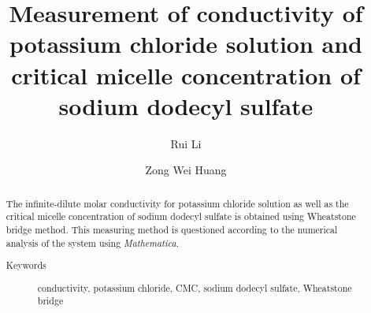 \documentclass[%
 reprint,
 amsmath,amssymb,
 aps,
]{revtex4-1}
\begin{document}

\title{Measurement of conductivity of potassium chloride solution and critical micelle concentration of sodium dodecyl sulfate}%

\author{Rui Li}
%


\author{Zong Wei Huang}
%



\begin{abstract}
The infinite-dilute molar conductivity for potassium chloride solution as well as the critical micelle concentration of sodium dodecyl sulfate is obtained using Wheatstone bridge method. This measuring method is questioned according to the numerical analysis of the system using \emph{Mathematica}.
\begin{description}
\item[Keywords]
conductivity, potassium chloride, CMC, sodium dodecyl sulfate, Wheatstone bridge
\end{description}
\end{abstract}

\maketitle
\end{document}
